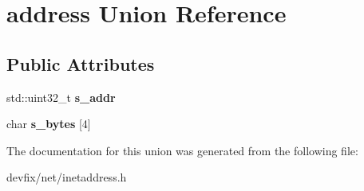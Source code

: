 \hypertarget{unionaddress}{}\section{address Union Reference}
\label{unionaddress}
\subsection*{Public Attributes}
\begin{DoxyCompactItemize}
\item 
\mbox{\label{unionaddress_a2bebc42b2bcf9bec5d48178d60f049c7}} 
std\+::uint32\+\_\+t {\bfseries s\+\_\+addr}
\item 
\mbox{\label{unionaddress_a3a6b414db00db509860c8537da888e24}} 
char {\bfseries s\+\_\+bytes} \mbox{[}4\mbox{]}
\end{DoxyCompactItemize}


The documentation for this union was generated from the following file\+:\begin{DoxyCompactItemize}
\item 
devfix/net/inetaddress.\+h\end{DoxyCompactItemize}

